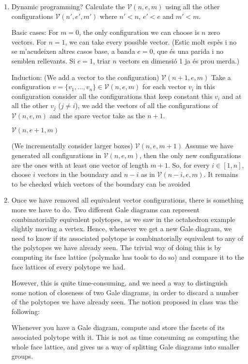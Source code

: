 \documentclass[11pt]{article}
\begin{document}
\begin{enumerate}
\item Dynamic programming? Calculate the $\mathcal{V}(n,e,m)$ using all the other configurations $\mathcal{V}(n',e',m')$ where $n'<n$, $e'<e$ and $m'<m$. 

Basic cases:
For $m=0$, the only configuration we can choose is $n$ zero vectors.
For $n=1$, we can take every possible vector.
(Estic molt esp\`es i no se m'acudeixen altres casos base, a banda $e=0$, que \'es una parida i no semblen rellevants. Si $e=1$, triar $n$ vectors en dimensi\'o 1 ja \'es prou merda.)

Induction:
(We add a vector to the configuration) $\mathcal{V}(n + 1,e,m)$
Take a configuration $v = \{v_1, \ldots, v_n\}\in \mathcal{V}(n,e,m)$ for each vector $v_i$ in this configuration consider all the configurations that keep constant this $v_i$ and at all the other $v_j$ ($j \neq i$), we add the vectors of all the configurations of $\mathcal{V}(n,e,m)$ and the spare vector take as the $n+1$.

$\mathcal{V}(n,e + 1,m)$

(We incrementally consider larger boxes) $\mathcal{V}(n,e,m + 1)$
Assume we have generated all configurations in $\mathcal{V}(n,e,m)$, then the only new configurations are the ones with at least one vector of length $m+1$. So, for every $i \in [1,n]$, choose $i$ vectors in the boundary and $n-i$ as in $\mathcal{V}(n-i,e,m)$. It remains to be checked which vectors of the boundary can be avoided


\item Once we have removed all equivalent vector configurations, there is something more we have to do. Two different Gale diagrams can represent combinatorially equivalent polytopes, as we saw in the octahedron example slightly moving a vertex. Hence, whenever we get a new Gale diagram, we need to know if its associated polytope is combinatorially equivalent to any of the polytopes we have already seen. The trivial way of doing this is by computing its face lattice (polymake has tools to do so) and compare it to the face lattices of every polytope we had.

However, this is quite time-consuming, and we need a way to distinguish some notion of closeness of two Gale diagrams, in order to discard a number of the polytopes we have already seen. The notion proposed in class was the following:

Whenever you have a Gale diagram, compute and store the facets of its associated polytope with it. This is not as time consuming as computing the whole face lattice, and gives us a way of splitting Gale diagrams into smaller groups.


\end{enumerate}
\end{document}
